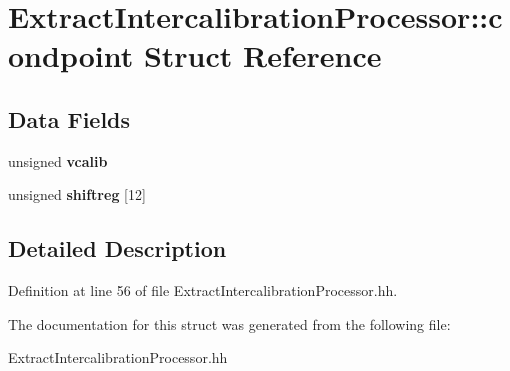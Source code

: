 \section{ExtractIntercalibrationProcessor::condpoint Struct Reference}
\label{structExtractIntercalibrationProcessor_1_1condpoint}
\subsection*{Data Fields}
\begin{DoxyCompactItemize}
\item 
unsigned {\bfseries vcalib}\label{structExtractIntercalibrationProcessor_1_1condpoint_ac5c276f523c1eef9621784169140e1b9}

\item 
unsigned {\bfseries shiftreg} [12]\label{structExtractIntercalibrationProcessor_1_1condpoint_ab82b62e1c2e2e4231763968305476e8c}

\end{DoxyCompactItemize}


\subsection{Detailed Description}


Definition at line 56 of file ExtractIntercalibrationProcessor.hh.

The documentation for this struct was generated from the following file:\begin{DoxyCompactItemize}
\item 
ExtractIntercalibrationProcessor.hh\end{DoxyCompactItemize}
